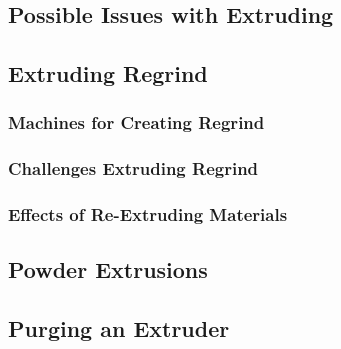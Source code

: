 \subsection{Possible Issues with Extruding\label{sec:literatureReview:extrusion:issues}}

\subsection{Extruding Regrind\label{sec:literatureReview:extrusion:regrind}}

\subsubsection{Machines for Creating Regrind\label{sec:literatureReview:extrusion:regrind:machines}}

\subsubsection{Challenges Extruding Regrind\label{sec:literatureReview:extrusion:regrind:challenges}}

\subsubsection{Effects of Re-Extruding Materials\label{sec:literatureReview:extrusion:regrind:effects}}

\subsection{Powder Extrusions\label{sec:literatureReview:extrusion:powder}}

\subsection{Purging an Extruder\label{sec:literatureReview:extrusion:purging}}

